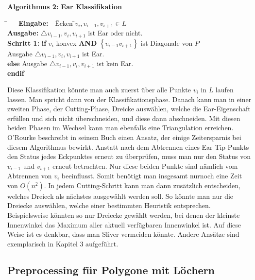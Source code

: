 \begin{flushleft}
  { \textbf{Algorithmus 2: Ear Klassifikation}
        \begin{tabbing}
          \=$~~~~~~$ \= \textbf{Eingabe:} $~~~$\=  Ecken \=${v_i, v_{i-1}, v_{i+1}} \in L$  $~~~~~~~~$\= \\
          \> \> \textbf{Ausgabe:} \> $\triangle v_{i-1}, v_i, v_{i+1}$ ist Ear oder nicht.\\
          \> \> \textbf{Schritt 1:} \>\textbf{if} $v_i$ konvex \textbf{AND} $\left\{v_{i-1}v_{i+1}\right\}$ ist Diagonale von $P$\\
          \> \> \> \>Ausgabe $\triangle v_{i-1}, v_i, v_{i+1}$ ist Ear.\\
          \> \> \> \textbf{else} Ausgabe $\triangle v_{i-1}, v_i, v_{i+1}$ ist kein Ear.\\
          \> \> \> \textbf{endif}\\
        \end{tabbing}
}
\end{flushleft}\pagebreak
Diese Klassifikation könnte man auch zuerst über alle Punkte $v_i$ in $L$ laufen lassen. Man spricht dann von der Klassifikationsphase. 
Danach kann man in einer zweiten Phase, der Cutting-Phase, Dreicke auswählen, welche die Ear-Eigenschaft erfüllen und sich nicht überschneiden, 
und diese dann abschneiden. Mit diesen beiden Phasen im Wechsel kann man ebenfalls eine Triangulation erreichen. 
O'Rourke beschreibt in seinem Buch einen Ansatz, der einige Zeitersparnis bei diesem Algorithmus bewirkt.\cite{orourke}
Anstatt nach dem Abtrennen eines Ear Tip Punkts den Status jedes Eckpunktes erneut zu überprüfen, muss man nur den Status von $v_{i-1}$ und $v_{i+1}$ erneut betrachten.
Nur diese beiden Punkte sind nämlich vom Abtrennen von $v_i$ beeinflusst. Somit benötigt man insgesamt nurnoch eine Zeit von $O(n^2)$.\cite{newAlg} 
In jedem Cutting-Schritt kann man dann zusätzlich entscheiden, welches Dreieck als nächstes ausgewählt werden soll. So könnte man nur die Dreiecke auswählen, welche einer bestimmten Heuristik entsprechen.
Beispielsweise könnten so nur Dreiecke gewählt werden, bei denen der kleinste Innenwinkel das Maximum aller aktuell verfügbaren Innenwinkel ist. Auf diese Weise ist es denkbar,
dass man Sliver vermeiden könnte. Andere Ansätze sind exemplarisch in Kapitel 3 aufgeführt.

\subsection{Preprocessing für Polygone mit Löchern}

